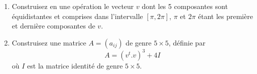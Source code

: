 \begin{exercice}\label{exoMatlab0029}

\begin{enumerate}
\item Construisez en une opération le vecteur $v$ dont les 5 composantes sont équidistantes et comprises dans l'intervalle $[\pi,2\pi]$, $\pi$ et $2\pi$ étant les première et dernière composantes de $v$. 
\item Construisez une matrice $A=(a_{ij})$ de genre $5\times 5$, définie par
\[ A= (v^t.v)^3 + 4I \]
où $I$ est la matrice identité de genre $5\times 5$.
\end{enumerate}

\end{exercice}
